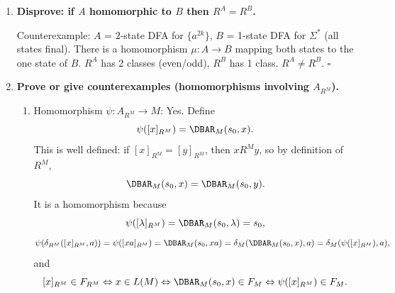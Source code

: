 \begin{enumerate}[{3.}1.]
\begin{enumerate}
\item No. Suppose $A$ and $B$ are connected, $L(A)=L(B)$, and $R^A=R^B$. Define
\[
\psi(\DBAR_A(s_{0A},x))=\DBAR_B(s_{0B},x).
\]
Because $R^A=R^B$, this is well defined: if $\DBAR_A(s_{0A},x)=\DBAR_A(s_{0A},y)$,
then $xR^Ay$, hence $xR^By$, and therefore
$\DBAR_B(s_{0B},x)=\DBAR_B(s_{0B},y)$. Since both machines are connected, the
map $\psi$ is onto: given $u\in S_B$, choose $x$ with
$\DBAR_B(s_{0B},x)=u$, and then
\[
\psi(\DBAR_A(s_{0A},x))=u.
\]
It is also one-to-one: if $\psi(s)=\psi(t)$, choose strings $x_s,x_t$ with
\[
\DBAR_A(s_{0A},x_s)=s,\qquad \DBAR_A(s_{0A},x_t)=t.
\]
Then
\[
\DBAR_B(s_{0B},x_s)=\psi(s)=\psi(t)=\DBAR_B(s_{0B},x_t),
\]
so $x_sR^Bx_t$. Since $R^A=R^B$, also $x_sR^Ax_t$, hence
\[
s=\DBAR_A(s_{0A},x_s)=\DBAR_A(s_{0A},x_t)=t.
\]
For transitions,
\[
\psi(\delta_A(\DBAR_A(s_{0A},x),a))
=\psi(\DBAR_A(s_{0A},xa))
=\DBAR_B(s_{0B},xa)
=\delta_B(\DBAR_B(s_{0B},x),a)
=\delta_B(\psi(\DBAR_A(s_{0A},x)),a).
\]
Finally, for any $x\in\Sigma^*$,
\[
\DBAR_A(s_{0A},x)\in F_A
\Leftrightarrow x\in L(A)
\Leftrightarrow x\in L(B)
\Leftrightarrow \DBAR_B(s_{0B},x)\in F_B,
\]
so $\psi$ preserves finality. Thus $\psi$ is an isomorphism
$A\cong B$, so in particular there is a homomorphism from $A$ to $B$. Such
examples therefore cannot exist.

\item Yes. The example from part (a) already works if we note that both machines
are reduced: $B$ is minimal and therefore reduced, and the extra state $r$ in
$A$ has language $\Sigma^*$, which is different from the state languages of
$q_0$ and $q_1$. So $A$ and $B$ are both reduced, $L(A)=L(B)$, and
$R^A=R^B$, but $A$ is still not homomorphic to $B$.
\end{enumerate}

\item \textbf{Disprove: if $A$ homomorphic to $B$ then $R^A=R^B$.}

Counterexample: $A$ = 2-state DFA for $\{a^{2k}\}$, $B$ = 1-state DFA for $\Sigma^*$ (all states final). There is a homomorphism $\mu: A\to B$ mapping both states to the one state of $B$. $R^A$ has 2 classes (even/odd), $R^B$ has 1 class. $R^A\neq R^B$. $\square$

\item \textbf{Prove or give counterexamples (homomorphisms involving $A_{R^M}$).}

\begin{enumerate}
\item Homomorphism $\psi: A_{R^M}\to M$: Yes. Define
\[
\psi([x]_{R^M})=\DBAR_M(s_0,x).
\]
This is well defined: if $[x]_{R^M}=[y]_{R^M}$, then $x R^M y$, so by
definition of $R^M$,
\[
\DBAR_M(s_0,x)=\DBAR_M(s_0,y).
\]
It is a homomorphism because
\[
\psi([\lambda]_{R^M})=\DBAR_M(s_0,\lambda)=s_0,
\]
\[
\psi(\delta_{R^M}([x]_{R^M},a))
=\psi([xa]_{R^M})
=\DBAR_M(s_0,xa)
=\delta_M(\DBAR_M(s_0,x),a)
=\delta_M(\psi([x]_{R^M}),a),
\]
and
\[
[x]_{R^M}\in F_{R^M}
\Leftrightarrow x\in L(M)
\Leftrightarrow \DBAR_M(s_0,x)\in F_M
\Leftrightarrow \psi([x]_{R^M})\in F_M.
\]


\end{enumerate}
\end{enumerate}
